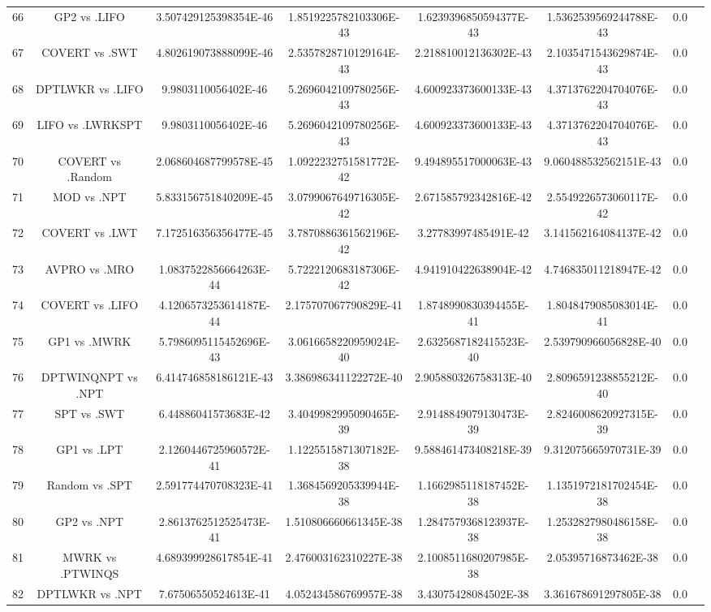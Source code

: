 \documentclass[a3paper,10pt]{article}
\begin{document}
\begin{table}[!htp]
\begin{tabular}{cccccccc}
66&GP2 vs .LIFO&3.507429125398354E-46&1.8519225782103306E-43&1.6239396850594377E-43&1.5362539569244788E-43&0.0\\
67&COVERT vs .SWT&4.802619073888099E-46&2.5357828710129164E-43&2.218810012136302E-43&2.1035471543629874E-43&0.0\\
68&DPTLWKR vs .LIFO&9.9803110056402E-46&5.2696042109780256E-43&4.600923373600133E-43&4.3713762204704076E-43&0.0\\
69&LIFO vs .LWRKSPT&9.9803110056402E-46&5.2696042109780256E-43&4.600923373600133E-43&4.3713762204704076E-43&0.0\\
70&COVERT vs .Random&2.068604687799578E-45&1.0922232751581772E-42&9.494895517000063E-43&9.060488532562151E-43&0.0\\
71&MOD vs .NPT&5.833156751840209E-45&3.0799067649716305E-42&2.671585792342816E-42&2.5549226573060117E-42&0.0\\
72&COVERT vs .LWT&7.172516356356477E-45&3.7870886361562196E-42&3.27783997485491E-42&3.141562164084137E-42&0.0\\
73&AVPRO vs .MRO&1.0837522856664263E-44&5.7222120683187306E-42&4.941910422638904E-42&4.746835011218947E-42&0.0\\
74&COVERT vs .LIFO&4.1206573253614187E-44&2.175707067790829E-41&1.8748990830394455E-41&1.8048479085083014E-41&0.0\\
75&GP1 vs .MWRK&5.7986095115452696E-43&3.0616658220959024E-40&2.6325687182415523E-40&2.539790966056828E-40&0.0\\
76&DPTWINQNPT vs .NPT&6.414746858186121E-43&3.386986341122272E-40&2.905880326758313E-40&2.8096591238855212E-40&0.0\\
77&SPT vs .SWT&6.44886041573683E-42&3.4049982995090465E-39&2.9148849079130473E-39&2.8246008620927315E-39&0.0\\
78&GP1 vs .LPT&2.1260446725960572E-41&1.1225515871307182E-38&9.588461473408218E-39&9.312075665970731E-39&0.0\\
79&Random vs .SPT&2.591774470708323E-41&1.3684569205339944E-38&1.1662985118187452E-38&1.1351972181702454E-38&0.0\\
80&GP2 vs .NPT&2.8613762512525473E-41&1.510806660661345E-38&1.2847579368123937E-38&1.2532827980486158E-38&0.0\\
81&MWRK vs .PTWINQS&4.689399928617854E-41&2.476003162310227E-38&2.1008511680207985E-38&2.05395716873462E-38&0.0\\
82&DPTLWKR vs .NPT&7.67506550524613E-41&4.052434586769957E-38&3.43075428084502E-38&3.361678691297805E-38&0.0\\

\end{tabular}
\end{table}
\end{document}
